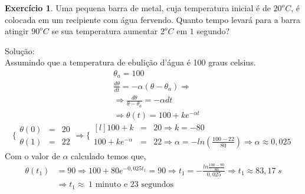 \documentclass[a4paper,12pt,reqno,natbib]{amsart}
\theoremstyle{definition}
\newtheorem{exercise}{Exerc\'icio}
\begin{document}
\vspace{0.6 cm}

\begin{exercise}
Uma pequena barra de metal, cuja temperatura inicial é de $20^{o}C$, é colocada em um recipiente com água fervendo. Quanto tempo levará para a barra atingir $90^{o}C$ se sua temperatura aumentar $2^{o}C$ em $1$ segundo?
\end{exercise}
Solu\c c\~ao:\\
Assumindo que a temperatura de ebuli\c c\~ao d'\'agua \'e 100 graus celsius.
\begin{align*}
	&\theta_a = 100\\
	&\frac{d\theta}{dt} = -\alpha(\theta - {\theta_a}) \Rightarrow\\
	&\Rightarrow \frac{d\theta}{\theta - {\theta_a}} = -\alpha dt\\
	&\Rightarrow  \theta(t) = 100 + ke^{-\alpha t}
\end{align*}
\[%
\bigg \{
\begin{matrix}
	\theta (0) &=& 20\\
	\theta (1) &=& 22	 
\end{matrix}
\Rightarrow 
\bigg \{
	\begin{matrix*}[l]
		100 + k &=& 20 \Rightarrow k = -80\\
		100 + ke^{-\alpha} &=& 22 \Rightarrow \alpha = -ln\left (\frac{100-22}{80}\right ) \Rightarrow \alpha \approx
		0,025
	\end{matrix*}
\]%
Com o valor de $\alpha$ calculado temos que,
\begin{align*}
	\theta(t_1) &= 90 \Rightarrow 100 + 80e^{-0,025t_1} = 90 \Rightarrow  t_1 = -\frac{ln \frac{100 -90}{80}}{0,025}
	\Rightarrow t_1 \approx 83,17 \hspace{3pt}s \\
	&\Rightarrow  \boxed{t_1 \approx \hspace{3pt} \mbox{1 minuto e 23 segundos} }
\end{align*}

\newpage



\begin{center}
\end{center}

\vspace{0.7 cm}
\end{document}
